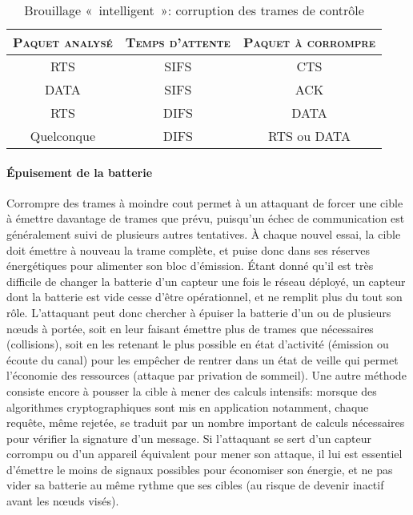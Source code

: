 \begin{table}[!ht]
    \caption{Brouillage « intelligent »: corruption des trames de contrôle}\label{ea:tab:smartjam}
    \centering
    \medskip
    \begin{tabular}{c c c}
        \toprule
        \textsc{Paquet analysé} & \textsc{Temps d'attente} & \textsc{Paquet à corrompre}\\
        \midrule
        RTS & SIFS & CTS\\
        DATA & SIFS & ACK\\
        RTS & DIFS & DATA\\
        Quelconque & DIFS & RTS ou DATA\\
        \bottomrule
    \end{tabular}
\end{table}

        \paragraph{Épuisement de la batterie}
Corrompre des trames à moindre cout permet à un attaquant de forcer une cible à émettre davantage de trames que prévu, puisqu'un échec de communication est généralement suivi de plusieurs autres tentatives.
À chaque nouvel essai, la cible doit émettre à nouveau la trame complète, et puise donc dans ses réserves énergétiques pour alimenter son bloc d'émission.
Étant donné qu'il est très difficile de changer la batterie d'un capteur une fois le réseau déployé, un capteur dont la batterie est vide cesse d'être opérationnel, et ne remplit plus du tout son rôle.
L'attaquant peut donc chercher à épuiser la batterie d'un ou de plusieurs nœuds à portée, soit en leur faisant émettre plus de trames que nécessaires (collisions), soit en les retenant le plus possible en état d'activité (émission ou écoute du canal) pour les empêcher de rentrer dans un état de veille qui permet l'économie des ressources (attaque par privation de sommeil).
Une autre méthode consiste encore à pousser la cible à mener des calculs intensifs: morsque des algorithmes cryptographiques sont mis en application notamment, chaque requête, même rejetée, se traduit par un nombre important de calculs nécessaires pour vérifier la signature d'un message.
Si l'attaquant se sert d'un capteur corrompu ou d'un appareil équivalent pour mener son attaque, il lui est essentiel d'émettre le moins de signaux possibles pour économiser son énergie, et ne pas vider sa batterie au même rythme que ses cibles (au risque de devenir inactif avant les nœuds visés).

